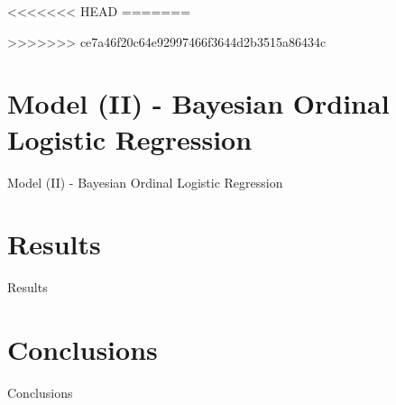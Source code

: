 \documentclass{beamer}\usepackage[]{graphicx}\usepackage[]{color}
\begin{document}
<<<<<<< HEAD
=======

>>>>>>> ce7a46f20c64e92997466f3644d2b3515a86434c
\section{Model (II) - Bayesian Ordinal Logistic Regression}
\begin{frame}{Model (II) - Bayesian Ordinal Logistic Regression}
\end{frame}

\section{Results}
\begin{frame}{Results}
\end{frame}



\section{Conclusions}
\begin{frame}{Conclusions}
\end{frame}

\appendix
\end{document}
